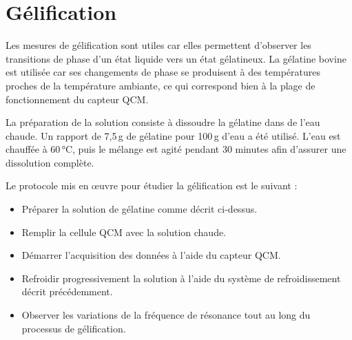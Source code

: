 \section{Gélification}
Les mesures de gélification sont utiles car elles permettent d'observer les transitions de phase d’un état liquide vers un état gélatineux. La gélatine bovine est utilisée car ses changements de phase se produisent à des températures proches de la température ambiante, ce qui correspond bien à la plage de fonctionnement du capteur QCM.

La préparation de la solution consiste à dissoudre la gélatine dans de l’eau chaude. Un rapport de 7,5 g de gélatine pour 100 g d’eau a été utilisé. L’eau est chauffée à 60 °C, puis le mélange est agité pendant 30 minutes afin d’assurer une dissolution complète.


Le protocole mis en œuvre pour étudier la gélification est le suivant :
\begin{itemize}
\item Préparer la solution de gélatine comme décrit ci-dessus.
\item Remplir la cellule QCM avec la solution chaude.
\item Démarrer l’acquisition des données à l’aide du capteur QCM.
\item Refroidir progressivement la solution à l’aide du système de refroidissement décrit précédemment.
\item Observer les variations de la fréquence de résonance tout au long du processus de gélification.
\end{itemize}
